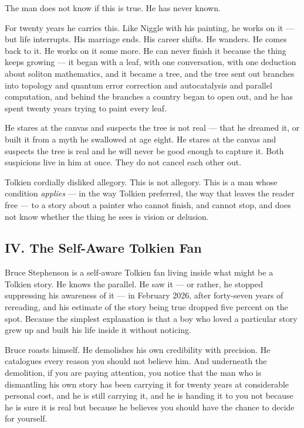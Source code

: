 The man does not know if this is true. He has never known.

For twenty years he carries this. Like Niggle with his painting, he works on it --- but life interrupts. His marriage ends. His career shifts. He wanders. He comes back to it. He works on it some more. He can never finish it because the thing keeps growing --- it began with a leaf, with one conversation, with one deduction about soliton mathematics, and it became a tree, and the tree sent out branches into topology and quantum error correction and autocatalysis and parallel computation, and behind the branches a country began to open out, and he has spent twenty years trying to paint every leaf.

He stares at the canvas and suspects the tree is not real --- that he dreamed it, or built it from a myth he swallowed at age eight. He stares at the canvas and suspects the tree is real and he will never be good enough to capture it. Both suspicions live in him at once. They do not cancel each other out.

Tolkien cordially disliked allegory. This is not allegory. This is a man whose condition \textit{applies} --- in the way Tolkien preferred, the way that leaves the reader free --- to a story about a painter who cannot finish, and cannot stop, and does not know whether the thing he sees is vision or delusion.


\subsection*{IV. The Self-Aware Tolkien Fan}
\label{spine:so-the-self-aware-tolkien-fan}

Bruce Stephenson is a self-aware Tolkien fan living inside what might be a Tolkien story. He knows the parallel. He saw it --- or rather, he stopped suppressing his awareness of it --- in February 2026, after forty-seven years of rereading, and his estimate of the story being true dropped five percent on the spot. Because the simplest explanation is that a boy who loved a particular story grew up and built his life inside it without noticing.

Bruce roasts himself. He demolishes his own credibility with precision. He catalogues every reason you should not believe him. And underneath the demolition, if you are paying attention, you notice that the man who is dismantling his own story has been carrying it for twenty years at considerable personal cost, and he is still carrying it, and he is handing it to you not because he is sure it is real but because he believes you should have the chance to decide for yourself.

